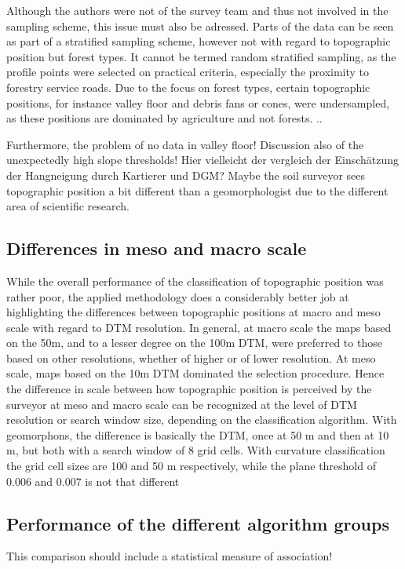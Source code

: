 \documentclass[final,1p,times,twocolumn,authoryear]{elsarticle}
\begin{document}
Although the authors were not of the survey team and thus not involved in the sampling scheme, this issue must also be adressed. Parts of the data can be seen as part of a stratified sampling scheme, however not with regard to topographic position but forest types. It cannot be termed random stratified sampling, as the profile points were selected on practical criteria, especially the proximity to forestry service roads. Due to the focus on forest types, certain topographic positions, for instance valley floor and debris fans or cones, were undersampled, as these positions are dominated by agriculture and not forests. ..   

Furthermore, the problem of no data in valley floor! Discussion also of the unexpectedly high slope thresholds!
Hier vielleicht der vergleich der Einschätzung der Hangneigung durch Kartierer und DGM?  Maybe the soil surveyor sees topographic position a bit different than a geomorphologist due to the different area of scientific research.

\subsection{Differences in meso and macro scale}
While the overall performance of the classification of topographic position was rather poor, the applied methodology does a considerably better job at highlighting the differences between topographic positions at macro and meso scale with regard to DTM resolution.
In general, at macro scale the maps based on the 50m, and to a lesser degree on the 100m DTM, were preferred to those based on other resolutions, whether of higher or of lower resolution. At meso scale, maps based on the 10m DTM dominated the selection procedure. Hence the difference in scale between how topographic position is perceived by the surveyor at meso and macro scale can be recognized at the level of DTM resolution or search window size, depending on the classification algorithm.
With geomorphons, the difference is basically the DTM, once at 50 m and then at 10 m, but both with a search window of 8 grid cells. With curvature classification the grid cell sizes are 100 and 50 m respectively, while the plane threshold of 0.006 and 0.007 is not that different

\subsection{Performance of the different algorithm groups} 
This comparison should include a statistical measure of association!
\end{document}
